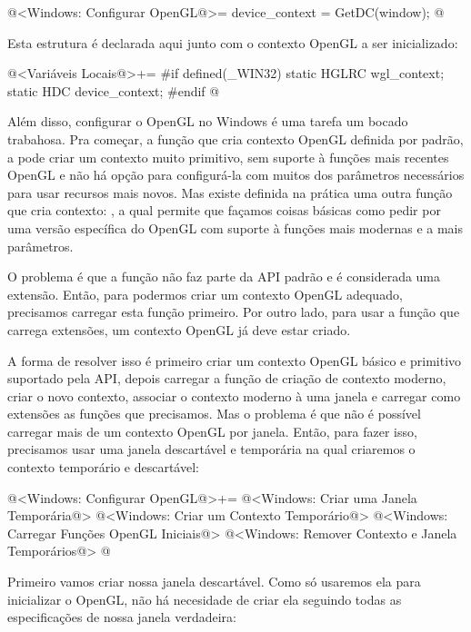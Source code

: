 \iniciocodigo
@<Windows: Configurar OpenGL@>=
device_context = GetDC(window);
@
\fimcodigo

Esta estrutura é declarada aqui junto com o contexto OpenGL a ser
inicializado:

\iniciocodigo
@<Variáveis Locais@>+=
#if defined(_WIN32)
static HGLRC wgl_context;
static HDC device_context;
#endif
@
\fimcodigo


Além disso, configurar o OpenGL no Windows é uma tarefa um bocado
trabahosa. Pra começar, a função que cria contexto OpenGL definida por
padrão, a  pode criar um contexto muito
primitivo, sem suporte à funções mais recentes OpenGL e não há opção
para configurá-la com muitos dos parâmetros necessários para usar
recursos mais novos. Mas existe definida na prática uma outra função
que cria contexto: , a qual
permite que façamos coisas básicas como pedir por uma versão
específica do OpenGL com suporte à funções mais modernas e a mais
parâmetros.

O problema é que a função  não
faz parte da API padrão e é considerada uma extensão. Então, para
podermos criar um contexto OpenGL adequado, precisamos carregar esta
função primeiro. Por outro lado, para usar a função que carrega
extensões, um contexto OpenGL já deve estar criado.

A forma de resolver isso é primeiro criar um contexto OpenGL básico e
primitivo suportado pela API, depois carregar a função de criação de
contexto moderno, criar o novo contexto, associar o contexto moderno à
uma janela e carregar como extensões as funções que precisamos. Mas o
problema é que não é possível carregar mais de um contexto OpenGL por
janela. Então, para fazer isso, precisamos usar uma janela descartável
e temporária na qual criaremos o contexto temporário e descartável:

\iniciocodigo
@<Windows: Configurar OpenGL@>+=
{
@<Windows: Criar uma Janela Temporária@>
@<Windows: Criar um Contexto Temporário@>
@<Windows: Carregar Funções OpenGL Iniciais@>
@<Windows: Remover Contexto e Janela Temporários@>
}
@
\fimcodigo

Primeiro vamos criar nossa janela descartável. Como só usaremos ela
para inicializar o OpenGL, não há necesidade de criar ela seguindo
todas as especificações de nossa janela verdadeira:

